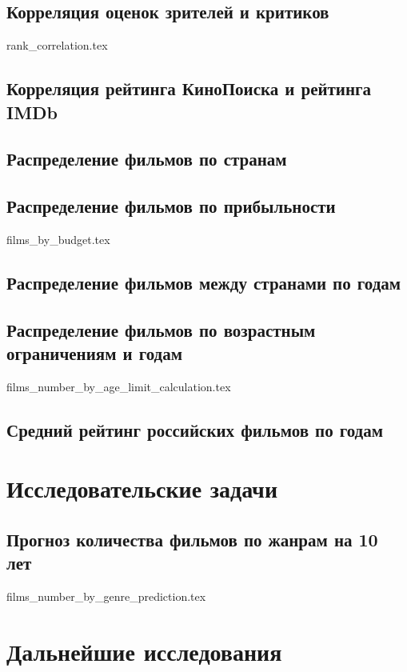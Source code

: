 \documentclass[conference]{IEEEtran}
\begin{document}
\subsection{Корреляция оценок зрителей и критиков}

{rank_correlation.tex}

\subsection{Корреляция рейтинга КиноПоиска и рейтинга IMDb}
\subsection{Распределение фильмов по странам}
\subsection{Распределение фильмов по прибыльности}

{films_by_budget.tex}

\subsection{Распределение фильмов между странами по годам}
\subsection{Распределение фильмов по возрастным ограничениям и годам}

{films_number_by_age_limit_calculation.tex}

\subsection{Средний рейтинг российских фильмов по годам}

\section{Исследовательские задачи}
\subsection{Прогноз количества фильмов по жанрам на 10 лет}

{films_number_by_genre_prediction.tex}

\section{Дальнейшие исследования}
\end{document}
